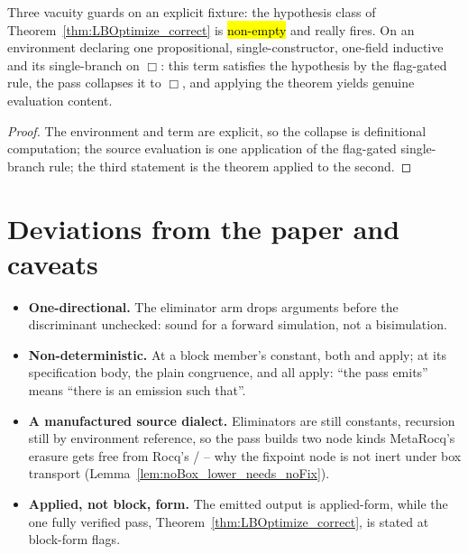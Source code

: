 \begin{lemma}
\label{lem:LBOptimize_correct_hyps_satisfiable}
\leanok
{}
 Three vacuity guards on an explicit fixture: the hypothesis class of
Theorem~\ref{thm:LBOptimize_correct} is \hl{non-empty} and really fires. On an environment declaring one
propositional, single-constructor, one-field inductive and its single-branch  on $\Box$: this
term satisfies the hypothesis by the flag-gated rule, the pass collapses it to $\Box$, and applying the
theorem yields genuine evaluation content.
\end{lemma}
\begin{proof}
\leanok
{}
 The environment and term are explicit, so the collapse is definitional computation; the
source evaluation is one application of the flag-gated single-branch rule; the third statement is the
theorem applied to the second.
\end{proof}

\section*{Deviations from the paper and caveats}
\begin{itemize}
\item \textbf{One-directional.} The eliminator arm drops arguments before the discriminant unchecked:
sound for a forward simulation, not a bisimulation.
\item \textbf{Non-deterministic.} At a block member's constant, both  and
 apply; at its specification body, the plain  congruence,
 and  all apply: ``the pass emits'' means ``there is an emission such
that''.
\item \textbf{A manufactured source dialect.} Eliminators are still constants, recursion still by
environment reference, so the pass builds two node kinds MetaRocq's erasure gets free from Rocq's
/ -- why the fixpoint node is not inert under box transport
(Lemma~\ref{lem:noBox_lower_needs_noFix}).
\item \textbf{Applied, not block, form.} The emitted output is applied-form, while the one fully
verified pass, Theorem~\ref{thm:LBOptimize_correct}, is stated at block-form flags.
\end{itemize}
